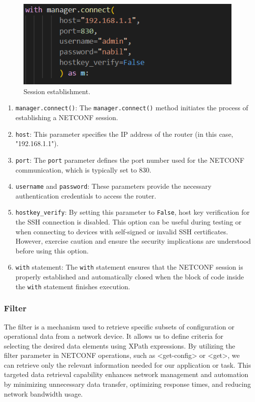 \begin{figure}[h]
    \centering
    \includegraphics[width=0.5\linewidth]{Images/m_connect.png}
    \caption{Session establishment.}
\end{figure}

\begin{enumerate}
    \item \texttt{manager.connect()}: The \texttt{manager.connect()} method initiates the process of establishing a NETCONF session.
    \item \texttt{host}: This parameter specifies the IP address of the router (in this case, "192.168.1.1").
    \item \texttt{port}: The \texttt{port} parameter defines the port number used for the NETCONF communication, which is typically set to 830.
    \item \texttt{username} and \texttt{password}: These parameters provide the necessary authentication credentials to access the router.
    \item \texttt{hostkey\_verify}: By setting this parameter to \texttt{False}, host key verification for the SSH connection is disabled. This option can be useful during testing or when connecting to devices with self-signed or invalid SSH certificates. However, exercise caution and ensure the security implications are understood before using this option.
    \item \texttt{with} statement: The \texttt{with} statement ensures that the NETCONF session is properly established and automatically closed when the block of code inside the \texttt{with} statement finishes execution.
\end{enumerate}
\subsubsection{Filter}
The filter is a mechanism used to retrieve specific subsets of configuration or operational data from a network device. It allows us to define criteria for selecting the desired data elements using XPath expressions. By utilizing the filter parameter in NETCONF operations, such as <get-config> or <get>, we can retrieve only the relevant information needed for our application or task. This targeted data retrieval capability enhances network management and automation by minimizing unnecessary data transfer, optimizing response times, and reducing network bandwidth usage. 

